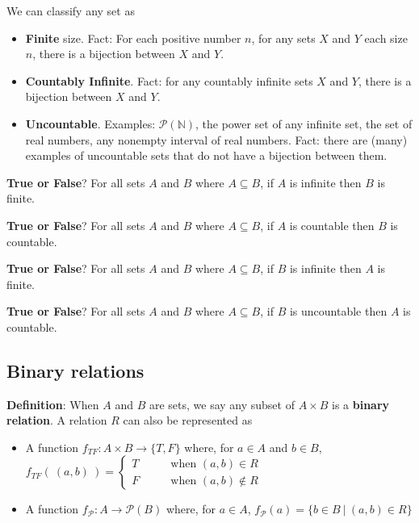 \documentclass[12pt, oneside]{article}
\begin{document}
\vfill

We can classify any set as 
\begin{itemize}
\item {\bf Finite} size. Fact: For each positive number $n$, for any sets $X$ and $Y$ each 
size $n$, there is a bijection between $X$ and $Y$.
\item {\bf Countably Infinite}. Fact: for any countably infinite sets $X$ and $Y$, there is a bijection
between $X$ and $Y$.
\item {\bf Uncountable}. Examples: $\mathcal{P}(\mathbb{N})$, the power set of any infinite set, 
the set of real numbers, any nonempty interval of real numbers. Fact: there are (many) examples 
of uncountable sets that do not have a bijection between them.
\end{itemize} \newpage


{\bf True or False}?  For all sets $A$ and $B$ where  $A \subseteq B$, 
if $A$ is infinite then $B$ is finite.

\vfill

{\bf True or False}?   For all sets $A$ and $B$ where  $A \subseteq B$, 
if $A$ is countable then $B$ is countable.

\vfill

{\bf True or False}?   For all sets $A$ and $B$ where  $A \subseteq B$, 
if $B$ is infinite then $A$ is finite.

\vfill

{\bf True or False}?   For all sets $A$ and $B$ where  $A \subseteq B$, 
if $B$ is uncountable then $A$ is countable.

\vfill \newpage

\newpage
\subsection*{Binary relations}


{\bf Definition}: When $A$ and $B$ are sets, we say any subset of $A \times B$ is a {\bf binary relation}. 
A relation $R$ can also be represented as

\begin{itemize}
\item A function $f_{TF} : A \times B \to \{T, F\}$
where, for $a \in A$ and $b \in B$, $f_{TF}(~(a,b)~) = 
\begin{cases} 
    T \qquad&\text{when } (a,b) \in R \\
    F \qquad&\text{when } (a,b) \notin R
\end{cases}$
\item A function $f_{\mathcal{P}} : A   \to \mathcal{P}(B)$ where, for $a \in A$, 
$f_{\mathcal{P}}( a ) = \{ b \in B ~|~ (a,b) \in R \}$
\end{itemize}
\end{document}
